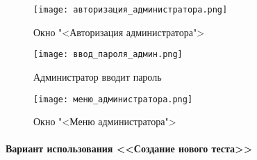 \begin{figure}[ht]
	\centering
	\texttt{[image: авторизация\_администратора.png]}
	\caption{Окно "<Авторизация администратора">}
	\label{admin_auth_window:image}
\end{figure}
\begin{figure}[H]
	\centering
	\texttt{[image: ввод\_пароля\_админ.png]}
	\caption{Администратор вводит пароль}
	\label{admin_password:image}
\end{figure}
\begin{figure}[H]
	\centering
	\texttt{[image: меню\_администратора.png]}
	\caption{Окно "<Меню администратора">}
	\label{admin_menu_1:image}
\end{figure}

\paragraph{Вариант использования <<Создание нового теста>>}

